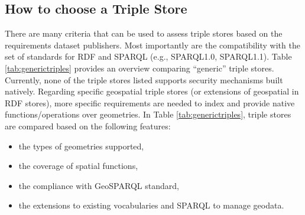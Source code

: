\subsection{How to choose a Triple Store }
There are many criteria that can be used to assess triple stores based on the requirements dataset publishers. Most importantly are the compatibility with the set of standards for RDF and SPARQL (e.g., SPARQL1.0, SPARQL1.1). Table \ref{tab:generictriples} provides an overview comparing ``generic'' triple stores. Currently, none of the triple stores listed supports security mechanisms built natively. Regarding specific geospatial triple stores (or extensions of geospatial in RDF stores), more specific requirements are needed to index and provide native functions/operations over geometries. In Table \ref{tab:generictriples}, triple stores are compared based on the following features:

\begin{itemize}
\item the types of geometries supported,
\item the coverage of spatial functions,
\item the compliance with GeoSPARQL standard,
\item the extensions to existing vocabularies and SPARQL to manage geodata.
\end{itemize}       




